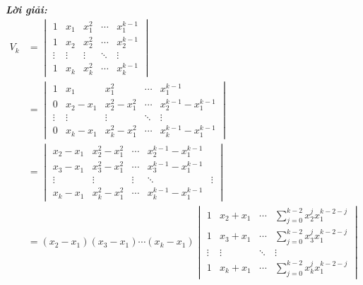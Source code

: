 \documentclass[12pt,a4paper,oneside]{book}
\newenvironment{loigiai}{%
    \par\noindent\textbf{\textit{\color{mainblue}Lời giải:}}\ \ignorespaces \\ 
}{%
    
}
\begin{document}
\begin{loigiai}
\[
\begin{aligned}
    V_k &= \begin{vmatrix}
    1 & x_1 & x_1^2 & \cdots & x_1^{k-1} \\
    1 & x_2 & x_2^2 & \cdots & x_2^{k-1} \\
    \vdots & \vdots & \vdots & \ddots & \vdots \\
    1 & x_k & x_k^2 & \cdots & x_k^{k-1}
\end{vmatrix} \\&= \begin{vmatrix}
    1 & x_1 & x_1^2 & \cdots & x_1^{k-1}\\
    0 & x_2-x_1 & x_2^2-x_1^2 & \cdots & x_2^{k-1}-x_1^{k-1} \\
    \vdots & \vdots & \vdots & \ddots & \vdots \\
    0 & x_k-x_1 & x_k^2-x_1^2 & \cdots & x_k^{k-1}-x_1^{k-1}
\end{vmatrix} \\ 
&= \begin{vmatrix}
    x_2-x_1 & x_2^2-x_1^2 & \cdots & x_2^{k-1}-x_1^{k-1} \\
    x_3-x_1 & x_3^2-x_1^2 & \cdots & x_3^{k-1}-x_1^{k-1} \\
    \vdots & \vdots & \vdots & \ddots & \vdots \\
    x_k-x_1 & x_k^2-x_1^2 & \cdots & x_k^{k-1}-x_1^{k-1}
\end{vmatrix} \\
& = (x_2-x_1)(x_3-x_1)\cdots(x_k-x_1)\begin{vmatrix}
    1 & x_2+x_1 & \cdots & \sum_{j=0}^{k-2} x_2^j x_1^{k-2-j} \\
    1 & x_3+x_1 & \cdots & \sum_{j=0}^{k-2} x_3^j x_1^{k-2-j} \\
    \vdots & \vdots & \ddots & \vdots \\
    1 & x_k+x_1 & \cdots & \sum_{j=0}^{k-2} x_k^j x_1^{k-2-j}
\end{vmatrix}
\end{aligned}
\]

\end{loigiai}
\end{document}
